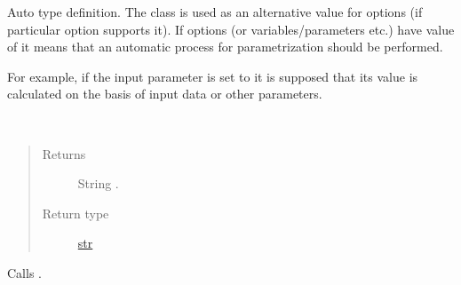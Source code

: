 \documentclass[a4paper,10pt,english]{sphinxmanual}
\begin{document}

\begin{fulllineitems}
\label{aqueduct.utils.helpers:aqueduct.utils.helpers.Auto}
Auto type definition.
The class is used as an alternative value for options (if particular option supports it).
If options (or variables/parameters etc.) have value of {\hyperref[aqueduct.utils.helpers:aqueduct.utils.helpers.Auto]{}} it means that an automatic
process for parametrization should be performed.

For example, if the input parameter is set to {\hyperref[aqueduct.utils.helpers:aqueduct.utils.helpers.Auto]{}} it is supposed that its value is calculated
on the basis of input data or other parameters.

\begin{fulllineitems}
\label{aqueduct.utils.helpers:aqueduct.utils.helpers.Auto.__repr__}~\begin{quote}\begin{description}
\item[{Returns}] \leavevmode
String .

\item[{Return type}] \leavevmode
\href{https://docs.python.org/2/library/functions.html\#str}{str}

\end{description}\end{quote}

\end{fulllineitems}


\begin{fulllineitems}
\label{aqueduct.utils.helpers:aqueduct.utils.helpers.Auto.__str__}
Calls {\hyperref[aqueduct.utils.helpers:aqueduct.utils.helpers.Auto.__repr__]{}}.

\end{fulllineitems}


\end{fulllineitems}

\end{document}
